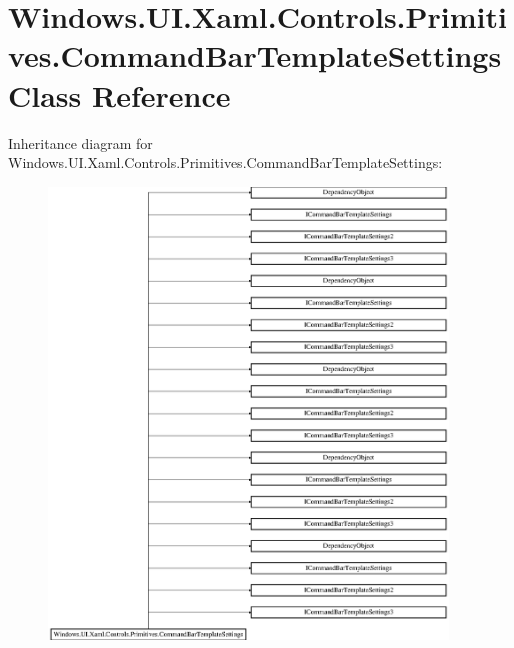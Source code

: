 \hypertarget{class_windows_1_1_u_i_1_1_xaml_1_1_controls_1_1_primitives_1_1_command_bar_template_settings}{}\section{Windows.\+U\+I.\+Xaml.\+Controls.\+Primitives.\+Command\+Bar\+Template\+Settings Class Reference}
\label{class_windows_1_1_u_i_1_1_xaml_1_1_controls_1_1_primitives_1_1_command_bar_template_settings}
Inheritance diagram for Windows.\+U\+I.\+Xaml.\+Controls.\+Primitives.\+Command\+Bar\+Template\+Settings\+:\begin{figure}[H]
\begin{center}
\leavevmode
\includegraphics[height=12.000000cm]{class_windows_1_1_u_i_1_1_xaml_1_1_controls_1_1_primitives_1_1_command_bar_template_settings}
\end{center}
\end{figure}
